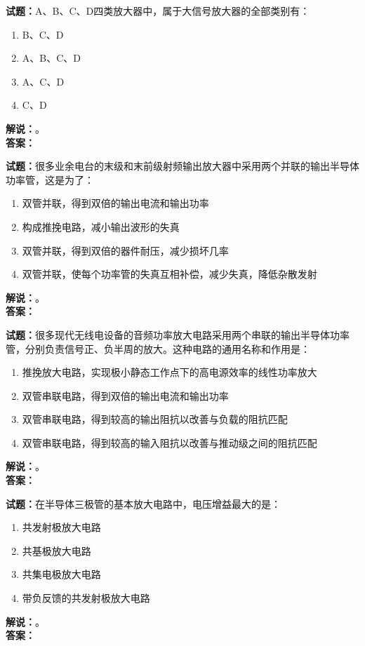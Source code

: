 \documentclass{ctexbook}
\begin{document}
\vspace{\baselineskip}

\noindent\textbf{试题：}A、B、C、D四类放大器中，属于大信号放大器的全部类别有：
\begin{enumerate}[leftmargin=3em]
  \item B、C、D
  \item A、B、C、D
  \item A、C、D
  \item C、D
\end{enumerate}
\noindent\textbf{解说：}\textbf{}。\\\noindent\textbf{答案：}

\vspace{\baselineskip}

\noindent\textbf{试题：}很多业余电台的末级和末前级射频输出放大器中采用两个并联的输出半导体功率管，这是为了：
\begin{enumerate}[leftmargin=3em]
  \item 双管并联，得到双倍的输出电流和输出功率
  \item 构成推挽电路，减小输出波形的失真
  \item 双管并联，得到双倍的器件耐压，减少损坏几率
  \item 双管并联，使每个功率管的失真互相补偿，减少失真，降低杂散发射
\end{enumerate}
\noindent\textbf{解说：}\textbf{}。\\\noindent\textbf{答案：}

\vspace{\baselineskip}

\noindent\textbf{试题：}很多现代无线电设备的音频功率放大电路采用两个串联的输出半导体功率管，分别负责信号正、负半周的放大。这种电路的通用名称和作用是：
\begin{enumerate}[leftmargin=3em]
  \item 推挽放大电路，实现极小静态工作点下的高电源效率的线性功率放大
  \item 双管串联电路，得到双倍的输出电流和输出功率
  \item 双管串联电路，得到较高的输出阻抗以改善与负载的阻抗匹配
  \item 双管串联电路，得到较高的输入阻抗以改善与推动级之间的阻抗匹配
\end{enumerate}
\noindent\textbf{解说：}\textbf{}。\\\noindent\textbf{答案：}

\vspace{\baselineskip}

\noindent\textbf{试题：}在半导体三极管的基本放大电路中，电压增益最大的是：
\begin{enumerate}[leftmargin=3em]
  \item 共发射极放大电路
  \item 共基极放大电路
  \item 共集电极放大电路
  \item 带负反馈的共发射极放大电路
\end{enumerate}
\noindent\textbf{解说：}\textbf{}。\\\noindent\textbf{答案：}
\end{document}
